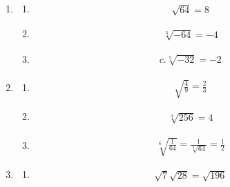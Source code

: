 \documentclass{article}
\begin{document}
\begin{enumerate}
\begin{enumerate}
\begin{align*}
			            \sqrt[4]{16}
			             = 2 
		            \end{align*}
		      \item
		            \begin{align*}
			            c. \sqrt[4]{\frac{1}{16}}
			             = \frac{1}{\sqrt[4]{16}}
			             = \frac{1}{2}
		            \end{align*}
	      \end{enumerate}
	\item
	      \begin{enumerate}
		      \item
		            \begin{align*}
			            \sqrt{64}
			             = 8 
		            \end{align*}
		      \item
		            \begin{align*}
			            \sqrt[3]{-64}
			             = -4 
		            \end{align*}
		      \item
		            \begin{align*}
			            c. \sqrt[5]{-32}
			             = -2
		            \end{align*}
	      \end{enumerate}
	\item
	      \begin{enumerate}
		      \item
		            \begin{align*}
			            \sqrt{\frac{4}{9}} = \frac{2}{3}
		            \end{align*}
		      \item
		            \begin{align*}
			            \sqrt[4]{256} = 4
		            \end{align*}
		      \item
		            \begin{align*}
			            \sqrt[6]{\frac{1}{64}}
			             = \frac{1}{\sqrt[6]{64}}
			             = \frac{1}{2}
		            \end{align*}
	      \end{enumerate}
	\item
	      \begin{enumerate}
		      \item
		            \begin{align*}
			            \sqrt{7}\sqrt{28}
			             = \sqrt{196}

\end{align*}
\end{enumerate}
\end{enumerate}
\end{document}
